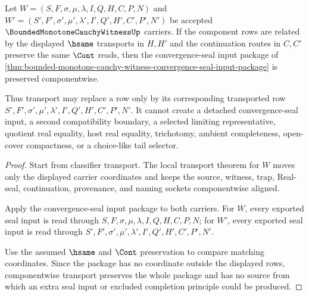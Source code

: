 \begin{theorem}
\label{thm:bounded-monotone-cauchy-witness-seal-input-transport}
Let $W=(S,F,\sigma,\mu,\lambda,I,Q,H,C,P,N)$ and $W'=(S',F',\sigma',\mu',\lambda',I',Q',H',C',P',N')$ be accepted $\BoundedMonotoneCauchyWitnessUp$ carriers. If the component rows are related by the displayed $\hsame$ transports in $H,H'$ and the continuation routes in $C,C'$ preserve the same $\Cont$ reads, then the convergence-seal input package of \autoref{thm:bounded-monotone-cauchy-witness-convergence-seal-input-package} is preserved componentwise.

Thus transport may replace a row only by its corresponding transported row $S',F',\sigma',\mu',\lambda',I',Q',H',C',P',N'$. It cannot create a detached convergence-seal input, a second compatibility boundary, a selected limiting representative, quotient real equality, host real equality, trichotomy, ambient completeness, open-cover compactness, or a choice-like tail selector.
\end{theorem}
\begin{proof}
Start from classifier transport. The local transport theorem for $W$ moves only the displayed carrier coordinates and keeps the source, witness, trap, Real-seal, continuation, provenance, and naming sockets componentwise aligned.

Apply the convergence-seal input package to both carriers. For $W$, every exported seal input is read through $S,F,\sigma,\mu,\lambda,I,Q,H,C,P,N$; for $W'$, every exported seal input is read through $S',F',\sigma',\mu',\lambda',I',Q',H',C',P',N'$.

Use the assumed $\hsame$ and $\Cont$ preservation to compare matching coordinates. Since the package has no coordinate outside the displayed rows, componentwise transport preserves the whole package and has no source from which an extra seal input or excluded completion principle could be produced.
\end{proof}

